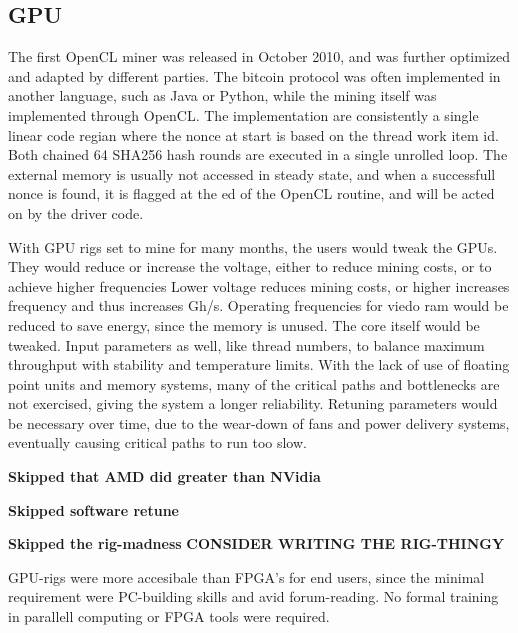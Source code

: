 \subsection{GPU}
The first OpenCL miner was released in October 2010, and was further optimized and adapted by different parties.
The bitcoin protocol was often implemented in another language, such as Java or Python, while the mining itself was implemented through OpenCL.
The implementation are consistently a single linear code regian where the nonce at start is based on the thread work item id.
Both chained 64 SHA256 hash rounds are executed in a single unrolled loop.
The external memory is usually not accessed in steady state, and when a successfull nonce is found, it is flagged at the ed of the OpenCL routine, and will be acted on by the driver code. 

With GPU rigs set to mine for many months, the users would tweak the GPUs.
They would reduce or increase the voltage, either to reduce mining costs, or to achieve higher frequencies
Lower voltage reduces mining costs, or higher increases frequency and thus increases Gh/s.
Operating frequencies for viedo ram would be reduced to save energy, since the memory is unused.
The core itself would be tweaked.
Input parameters as well, like thread numbers, to balance maximum throughput with stability and temperature limits.
With the lack of use of floating point units and memory systems, many of the critical paths and bottlenecks are not exercised, giving the system a longer reliability. 
Retuning parameters would be necessary over time, due to the wear-down of fans and power delivery systems, eventually causing critical paths to run too slow.

\textbf{Skipped that AMD did greater than NVidia}

\textbf{Skipped software retune}

\textbf{Skipped the rig-madness}
\textbf{CONSIDER WRITING THE RIG-THINGY}

GPU-rigs were more accesibale than FPGA's for end users, since the minimal requirement were PC-building skills and avid forum-reading.
No formal training in parallell computing or FPGA tools were required.

